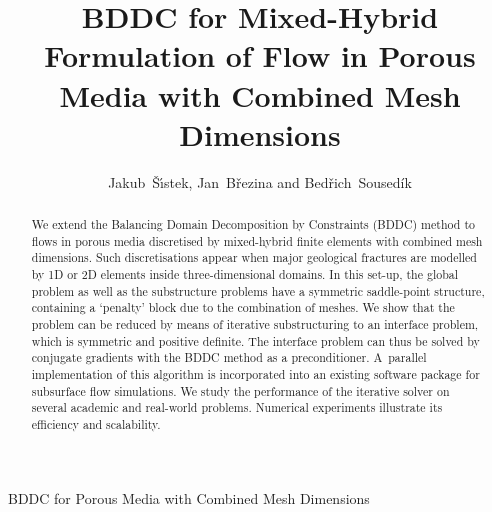 \title
{BDDC for Mixed-Hybrid Formulation of Flow in Porous Media with Combined Mesh Dimensions}
\author{
Jakub~{\v S}{\'\i}stek, 
Jan~B{\v r}ezina and
Bed\v{r}ich~Soused\'{i}k
}
{BDDC for Porous Media with Combined Mesh Dimensions}
\address{
Institute of Mathematics,
Academy of Sciences of the Czech Republic,
\v Zitn\' a 25, 115~67~Prague~1, Czech Republic
\break{}
Faculty of Mechatronics, Informatics and Interdisciplinary Studies,
Technical University of Liberec,
H\'alkova~6,~461~17~Liberec~1, Czech Republic
\break{}
Department of Mathematics and Statistics, 
University of Maryland,
Baltimore County, 
1000 Hilltop Circle, Baltimore, MD 21250, USA
}
\begin{abstract}
We extend the Balancing Domain Decomposition by Constraints (BDDC) method
to flows in porous media discretised by mixed-hybrid finite elements with combined mesh dimensions.
Such discretisations appear when major geological fractures are modelled
by 1D or 2D elements inside three-dimensional domains.
In this set-up, the global problem as well as the substructure problems have a symmetric saddle-point structure,
containing a `penalty' block due to the combination of meshes.
We show that the problem can be reduced by means of iterative substructuring
to an interface problem, which is symmetric and positive definite.
The interface problem can thus be solved by conjugate gradients with the BDDC method as a preconditioner.
A~parallel implementation of this algorithm is incorporated into an existing software package for subsurface flow simulations.
We study the performance of the iterative solver on several academic and real-world problems.
Numerical experiments illustrate its efficiency and scalability.
\end{abstract}
